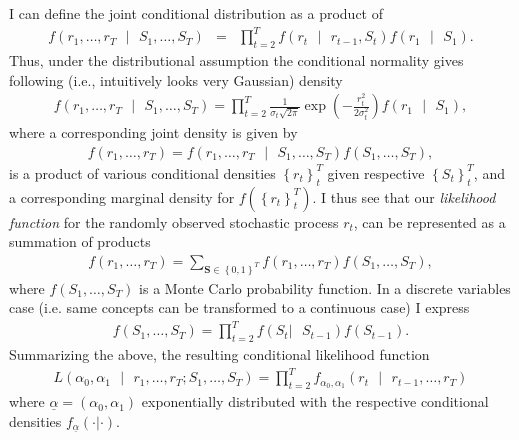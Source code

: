 \documentclass[a4paper,11pt,english]{article}
\begin{document}
				I can define the joint conditional distribution as a product of
				\begin{eqnarray*}
f(r_1,\ldots, r_T \text{ } | \text{ } S_1,\ldots, S_T) &=& \prod_{t=2}^T f(r_t \text{ } | \text{ } r_{t-1}, S_t)f(r_1 \text{ } | \text{ } S_1). 
				\end{eqnarray*}
				Thus, under the distributional assumption the conditional normality gives following (i.e., intuitively looks very Gaussian) density 
				\begin{eqnarray} \label{eq:lik}
f(r_1,\ldots, r_T \text{ }|\text{ } S_1,\ldots, S_T)=\prod_{t=2}^T\frac{1}{\sigma_t\sqrt{2\pi}}\exp{(-\frac{r^2_t}{2\sigma_t^2})} f(r_1 \text{ } | \text{ } S_1), 
				\end{eqnarray}
				where a corresponding joint density is given by 
				\begin{eqnarray*}
					f(r_1,\ldots, r_T) = f(r_1,\ldots, r_T \text{ } | \text{ } S_1,\ldots, S_T) f(S_1,\ldots, S_T),
				\end{eqnarray*}
				is a product of various conditional densities $\left\{r_t \right\}_t^T$ given respective $\left\{S_t \right\}_t^T$, and a corresponding 
				marginal density for $f(\left\{r_t \right\}_t^T)$. I thus see that our \textit{likelihood function} for the randomly observed stochastic 
				process $r_t$, can be represented as a summation of products
				\begin{eqnarray*}
					f(r_1,\ldots, r_T) = \sum_{\textbf{S}\in\left\{0,1\right\}^T} f(r_1,\ldots, r_T) f(S_1,\ldots, S_T),
				\end{eqnarray*}
				where $f(S_1,\ldots, S_T)$ is a Monte Carlo probability function. In a discrete variables case (i.e. same concepts can be transformed to a 
				continuous case) I express 			
				\begin{eqnarray*}
					f(S_1,\ldots, S_T) = \prod_{t=2}^T f(S_t \text{} |\text{ } S_{t-1}) f(S_{t-1}).
				\end{eqnarray*}
				Summarizing the above, the resulting conditional likelihood function
				\begin{eqnarray*}
L(\alpha_0, \alpha_1 \text{ }|\text{ } r_1, \ldots, r_T; S_1, \ldots, S_T) = \prod_{t=2}^T{f_{\alpha_0, \alpha_1}(r_t \text{ } | \text{ }r_{t-1},\ldots, r_T)}
				\end{eqnarray*}
				where $\underline{\alpha} = (\alpha_0, \alpha_1)$ exponentially distributed with the respective conditional densities 
				$f_{\underline{\alpha}} (\cdot|\cdot)$. 
			
\end{document}
